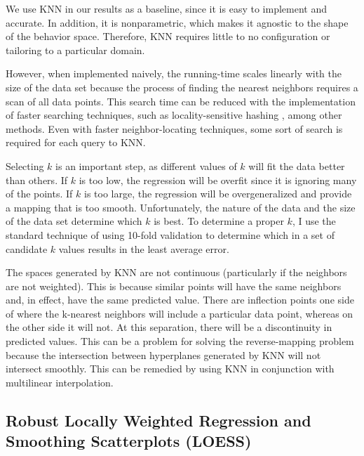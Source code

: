 We use KNN in our results as a baseline, since it is easy to implement and accurate.
In addition, it is nonparametric, which makes it agnostic to the shape of the behavior space.
Therefore, KNN requires little to no configuration or tailoring to a particular domain.

However, when implemented naively, the running-time scales linearly with the size of the data set because the process of finding the nearest neighbors requires a scan of all data points.
This search time can be reduced with the implementation of faster searching techniques, such as locality-sensitive hashing \cite{gionis1999similarity}, among other methods.
Even with faster neighbor-locating techniques, some sort of search is required for each query to KNN.

Selecting $k$ is an important step, as different values of $k$ will fit the data better than others.
If $k$ is too low, the regression will be overfit since it is ignoring many of the points.
If $k$ is too large, the regression will be overgeneralized and provide a mapping that is too smooth.
Unfortunately, the nature of the data and the size of the data set determine which $k$ is best.
To determine a proper $k$, I use the standard technique of using 10-fold validation to determine which in a set of candidate $k$ values results in the least average error.

The spaces generated by KNN are not continuous (particularly if the neighbors are not weighted).
This is because similar points will have the same neighbors and, in effect, have the same predicted value.
There are inflection points one side of where the k-nearest neighbors will include a particular data point, whereas on the other side it will not.
At this separation, there will be a discontinuity in predicted values.
This can be a problem for solving the reverse-mapping problem because the intersection between hyperplanes generated by KNN will not intersect smoothly.
This can be remedied by using KNN in conjunction with multilinear interpolation.
      
\subsection{Robust Locally Weighted Regression and Smoothing Scatterplots (LOESS)}


